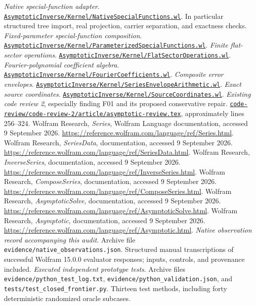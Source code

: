 \documentclass[11pt,letterpaper]{article}
\newcommand{\repolink}[2]{\href{https://github.com/VladimirReshetnikov/Asymptotic/blob/921387e5ba1239bfda96e63e64e89bf63d9c41e6/#1}{\nolinkurl{#2}}}
\begin{document}
\begin{thebibliography}{99}
\emph{Native special-function adapter}. \repolink{AsymptoticInverse/Kernel/NativeSpecialFunctions.wl}{AsymptoticInverse/Kernel/NativeSpecialFunctions.wl}. In particular structured tree import, real projection, carrier separation, and exactness checks.
\emph{Fixed-parameter special-function composition}. \repolink{AsymptoticInverse/Kernel/ParameterizedSpecialFunctions.wl}{AsymptoticInverse/Kernel/ParameterizedSpecialFunctions.wl}.
\emph{Finite flat-sector operations}. \repolink{AsymptoticInverse/Kernel/FlatSectorOperations.wl}{AsymptoticInverse/Kernel/FlatSectorOperations.wl}.
\emph{Fourier-polynomial coefficient algebra}. \repolink{AsymptoticInverse/Kernel/FourierCoefficients.wl}{AsymptoticInverse/Kernel/FourierCoefficients.wl}.
\emph{Composite error envelopes}. \repolink{AsymptoticInverse/Kernel/SeriesEnvelopeArithmetic.wl}{AsymptoticInverse/Kernel/SeriesEnvelopeArithmetic.wl}.
\emph{Exact source coordinates}. \repolink{AsymptoticInverse/Kernel/SourceCoordinates.wl}{AsymptoticInverse/Kernel/SourceCoordinates.wl}.
\emph{Existing code review 2}, especially finding F01 and its proposed conservative repair. \repolink{code-review/code-review-2/article/asymptotic-review.tex}{code-review/code-review-2/article/asymptotic-review.tex}, approximately lines 256--324.
Wolfram Research, \emph{Series}, Wolfram Language documentation, accessed 9 September 2026. \url{https://reference.wolfram.com/language/ref/Series.html}.
Wolfram Research, \emph{SeriesData}, documentation, accessed 9 September 2026. \url{https://reference.wolfram.com/language/ref/SeriesData.html}.
Wolfram Research, \emph{InverseSeries}, documentation, accessed 9 September 2026. \url{https://reference.wolfram.com/language/ref/InverseSeries.html}.
Wolfram Research, \emph{ComposeSeries}, documentation, accessed 9 September 2026. \url{https://reference.wolfram.com/language/ref/ComposeSeries.html}.
Wolfram Research, \emph{AsymptoticSolve}, documentation, accessed 9 September 2026. \url{https://reference.wolfram.com/language/ref/AsymptoticSolve.html}.
Wolfram Research, \emph{Asymptotic}, documentation, accessed 9 September 2026. \url{https://reference.wolfram.com/language/ref/Asymptotic.html}.
\emph{Native observation record accompanying this audit}. Archive file \nolinkurl{evidence/native_observations.json}. Structured manual transcriptions of successful Wolfram 15.0.0 evaluator responses; inputs, controls, and provenance included.
\emph{Executed independent prototype tests}. Archive files \nolinkurl{evidence/python_test_log.txt}, \nolinkurl{evidence/python_validation.json}, and \nolinkurl{tests/test_closed_frontier.py}. Thirteen test methods, including forty deterministic randomized oracle subcases.
\end{thebibliography}
\end{document}
